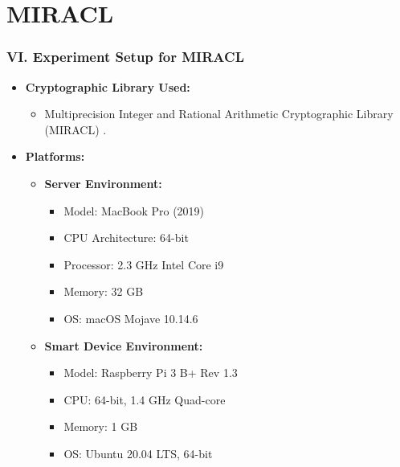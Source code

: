\documentclass[9pt,handout]{beamer}
\begin{document}
\section{MIRACL}
\begin{frame}
    \frametitle{VI. Experiment Setup for MIRACL}
    \begin{itemize}
        \item \textbf{Cryptographic Library Used:} 
            \begin{itemize}
                \item Multiprecision Integer and Rational Arithmetic Cryptographic Library (MIRACL) \cite{miracl2020}.
            \end{itemize}
        \item \textbf{Platforms:}
            \begin{itemize}
                \item \textbf{Server Environment:}
                    \begin{itemize}
                        \item Model: MacBook Pro (2019)
                        \item CPU Architecture: 64-bit
                        \item Processor: 2.3 GHz Intel Core i9
                        \item Memory: 32 GB
                        \item OS: macOS Mojave 10.14.6
                    \end{itemize}
                \item \textbf{Smart Device Environment:}
                    \begin{itemize}
                        \item Model: Raspberry Pi 3 B+ Rev 1.3
                        \item CPU: 64-bit, 1.4 GHz Quad-core
                        \item Memory: 1 GB
                        \item OS: Ubuntu 20.04 LTS, 64-bit
                    \end{itemize}
            \end{itemize}
    \end{itemize}
\end{frame}
\end{document}
